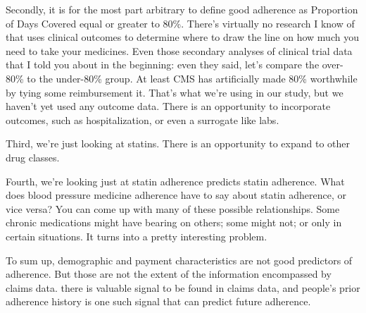 \documentclass[12pt]{report}
\begin{document}
\begin{large}
Secondly, it is for the most part arbitrary to define good adherence
as Proportion of Days Covered equal or greater to 80\%. There's
virtually no research I know of that uses clinical outcomes to
determine where to draw the line on how much you need to take your
medicines. Even those secondary analyses of clinical trial data that I
told you about in the beginning: even they said, let's compare the
over-80\% to the under-80\% group. At least CMS has artificially made
80\% worthwhile by tying some reimbursement it. That's what we're using
in our study, but we haven't yet used any outcome data. There is an
opportunity to incorporate outcomes, such as hospitalization, or even a
surrogate like labs.

Third, we're just looking at statins. There is an opportunity to
expand to other drug classes.

Fourth, we're looking just at statin adherence predicts statin
adherence. What does blood pressure medicine adherence have to say
about statin adherence, or vice versa? You can come up with many of
these possible relationships. Some chronic medications might have
bearing on others; some might not; or only in certain situations. It
turns into a pretty interesting problem.

To sum up, demographic and payment characteristics are not good
predictors of adherence. But those are not the extent of the
information encompassed by claims data. there is valuable signal to be
found in claims data, and people's prior adherence history is one such
signal that can predict future adherence.

\end{large}
\end{document}
